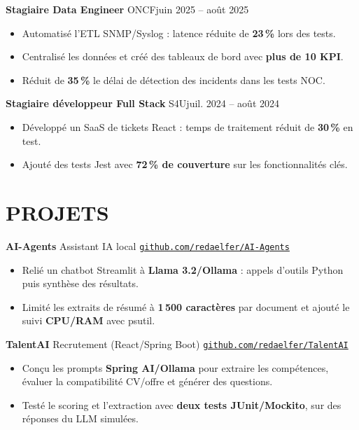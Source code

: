 \documentclass[11pt,a4paper]{article}
\newcommand{\entry}[2]{\noindent #1\hfill #2\par}
\newcommand{\jobgap}{\vspace{5pt}}
\begin{document}
\jobgap
\entry{\textbf{Stagiaire Data Engineer} \textbar{} ONCF}{juin 2025 -- août 2025}
\begin{itemize}
  \item Automatisé l'ETL SNMP/Syslog : latence réduite de \textbf{23\,\%} lors des tests.
  \item Centralisé les données et créé des tableaux de bord avec \textbf{plus de 10 KPI}.
  \item Réduit de \textbf{35\,\%} le délai de détection des incidents dans les tests NOC.
\end{itemize}

\jobgap
\entry{\textbf{Stagiaire développeur Full Stack} \textbar{} S4U}{juil. 2024 -- août 2024}
\begin{itemize}
  \item Développé un SaaS de tickets React : temps de traitement réduit de \textbf{30\,\%} en test.
  \item Ajouté des tests Jest avec \textbf{72\,\% de couverture} sur les fonctionnalités clés.
\end{itemize}

\section*{PROJETS}

\textbf{AI-Agents} \textbar{} Assistant IA local \textbar{} \href{https://github.com/redaelfer/AI-Agents}{\nolinkurl{github.com/redaelfer/AI-Agents}}\par
\begin{itemize}
  \item Relié un chatbot Streamlit à \textbf{Llama 3.2/Ollama} : appels d'outils Python puis synthèse des résultats.
  \item Limité les extraits de résumé à \textbf{1\,500 caractères} par document et ajouté le suivi \textbf{CPU/RAM} avec psutil.
\end{itemize}

\jobgap
\textbf{TalentAI} \textbar{} Recrutement (React/Spring Boot) \textbar{} \href{https://github.com/redaelfer/TalentAI}{\nolinkurl{github.com/redaelfer/TalentAI}}\par
\begin{itemize}
  \item Conçu les prompts \textbf{Spring AI/Ollama} pour extraire les compétences, évaluer la compatibilité CV/offre et générer des questions.
  \item Testé le scoring et l'extraction avec \textbf{deux tests JUnit/Mockito}, sur des réponses du LLM simulées.
\end{itemize}
\end{document}
